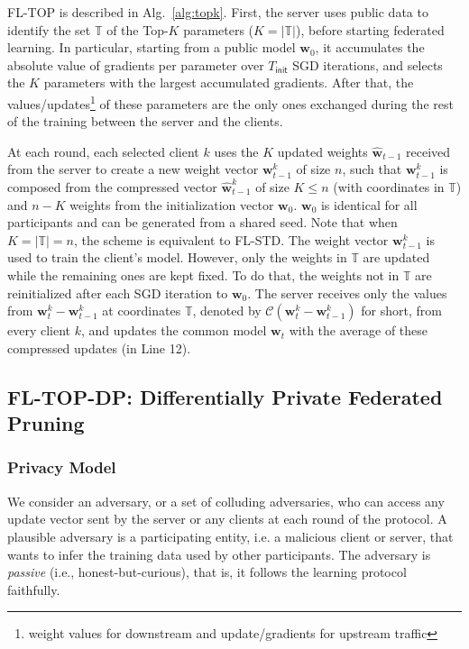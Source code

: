 \documentclass[accepted]{uai2021} %
\newcommand{\mbf}[1]{{\mathbf{#1}}}
\newcommand{\TOPK}{Top-$K$\xspace}
\begin{document}
FL-TOP is described in Alg.~\ref{alg:topk}. First, the server uses public data to identify the set $\mathbb{T}$ of the \TOPK parameters ($K=|\mathbb{T}|$), before starting federated learning. In particular, starting from a public model $\mbf{w}_0$, it accumulates the absolute value of gradients per parameter over $T_{\mathsf{init}}$ SGD iterations, and selects the $K$ parameters with the largest accumulated gradients. 
After that, the values/updates\footnote{weight values for downstream and update/gradients for upstream traffic} of these parameters are the only ones exchanged during the rest of the training between the server and the clients. 

At each round, each selected client $k$ uses the $K$ updated weights $\hat{\mbf{w}}_{t-1}$ received from the server to create a new weight vector $\mbf{w}_{t-1}^{k}$ of size $n$, such that $\mbf{w}_{t-1}^{k}$ is composed from the compressed vector $\hat{\mbf{w}}_{t-1}^{k}$ of size $K \leq n$ (with coordinates in $\mathbb{T}$) and $n-K$ weights from the initialization vector $\mbf{w}_0$. $\mbf{w}_0$ is identical for all participants and can be generated from a shared seed.
Note that when $K=|\mathbb{T}|=n$, the scheme is equivalent to FL-STD. 
The weight vector $\mbf{w}_{t-1}^{k}$ is used to train the client's model. However, only the weights in $\mathbb{T}$ are updated while the remaining ones are kept fixed. To do that, the weights not in $\mathbb{T}$ are reinitialized after each SGD iteration to $\mbf{w}_0$.
The server receives only the values from $\mbf{w}_{t}^{k} - \mbf{w}_{t-1}^{k}$ at coordinates $\mathbb{T}$, denoted by $\mathcal{C}(\mbf{w}_{t}^{k} - \mbf{w}_{t-1}^{k})$ for short, from every client $k$, and updates the common model $\mathbf{w}_t$ with the average of these compressed updates (in Line 12).





\subsection{FL-TOP-DP: Differentially Private Federated Pruning}
\label{sec:fl_top_k_dp}


\subsubsection{Privacy Model}
\label{sec:privacy_model}
We consider an adversary, or a set of colluding adversaries, who can access any update vector sent by the server or any clients at each round of the protocol.  A plausible adversary is a participating entity, i.e. a malicious client or server, that wants to infer the training data used by other participants.
The adversary is \emph{passive} (i.e., honest-but-curious), that is, it follows the learning protocol faithfully. 
\end{document}
